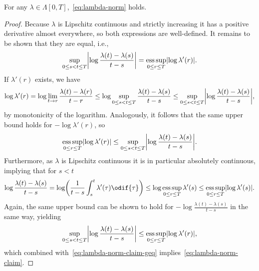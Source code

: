 \begin{lemma}
  For any \( \lambda \in \Lambda[0,T] \),~\eqref{eq:lambda-norm} holds.
\end{lemma}
\begin{proof}
  Because \( \lambda \) is Lipschitz continuous and strictly increasing it has a positive derivative almost everywhere, so both expressions are well-defined.
  It remains to be shown that they are equal, i.e.,
  \begin{equation}\label{eq:lambda-norm-claim}
    \sup_{0 \leq s < t \leq T} \abs*{ \log \frac{\lambda(t)-\lambda(s)}{t-s} } = \esssup_{0 \leq r \leq T} \abs{ \log \lambda'(r) }.
  \end{equation}
  If \( \lambda'(r) \) exists, we have
  \begin{equation}
    \log \lambda'(r) = \log \lim_{t \to r} \frac{\lambda(t)-\lambda(r)}{t-r}
    \leq \log \sup_{0 \leq s < t \leq T} \frac{\lambda(t)-\lambda(s)}{t-s}
    \leq \sup_{0 \leq s < t \leq T} \abs*{ \log \frac{\lambda(t)-\lambda(s)}{t-s} },
  \end{equation}
  by monotonicity of the logarithm.
  Analogously, it follows that the same upper bound holds for \( -\log \lambda'(r) \), so
  \begin{equation}\label{eq:lambda-norm-claim-geq}
    \esssup_{0 \leq r \leq T} \abs{ \log \lambda'(r) } \leq \sup_{0 \leq s < t \leq T} \abs*{ \log \frac{\lambda(t)-\lambda(s)}{t-s} }.
  \end{equation}
  Furthermore, as \( \lambda \) is Lipschitz continuous it is in particular absolutely continuous, implying that for \( s < t \)
  \begin{equation}
    \log \frac{\lambda(t)-\lambda(s)}{t-s} = \log \br*{ \frac{1}{t-s} \int_s^t \lambda'(\tau) \odif{\tau} }
    \leq \log \esssup_{0 \leq r \leq T} \lambda'(s)
    \leq \esssup_{0 \leq r \leq T} \abs{ \log \lambda'(s) }.
  \end{equation}
  Again, the same upper bound can be shown to hold for \( -\log \frac{\lambda(t)-\lambda(s)}{t-s} \) in the same way, yielding
  \begin{equation}
    \sup_{0 \leq s < t \leq T} \abs*{ \log \frac{\lambda(t)-\lambda(s)}{t-s} } \leq \esssup_{0 \leq r \leq T} \abs{ \log \lambda'(r) },
  \end{equation}
  which combined with~\eqref{eq:lambda-norm-claim-geq} implies~\eqref{eq:lambda-norm-claim}.
\end{proof}

